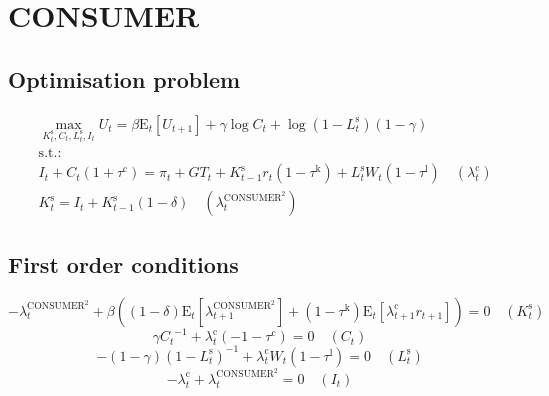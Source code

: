 

\section{CONSUMER}

\subsection{Optimisation problem}

\begin{align}
&\max_{K^{\mathrm{s}}_{t}, C_{t}, L^{\mathrm{s}}_{t}, I_{t}
} U_{t} = {\beta} {\mathrm{E}_{t}\left[U_{t+1}\right]} + {\gamma} {\log{C_{t}}} + {\log\left(1 - L^{\mathrm{s}}_{t}\right)} \left(1 - \gamma\right)\\
&\mathrm{s.t.:}\nonumber\\
& I_{t} + {C_{t}} \left(1 + \tau^{\mathrm{c}}\right) = \pi_{t} + {G\!T}_{t} + {K^{\mathrm{s}}_{t-1}} {r_{t}} \left(1 - \tau^{\mathrm{k}}\right) + {L^{\mathrm{s}}_{t}} {W_{t}} \left(1 - \tau^{\mathrm{l}}\right) \quad \left(\lambda^{\mathrm{c}}_{t}\right)\\
& K^{\mathrm{s}}_{t} = I_{t} + {K^{\mathrm{s}}_{t-1}} \left(1 - \delta\right) \quad \left(\lambda^{\mathrm{CONSUMER}^{\mathrm{2}}}_{t}\right)
\end{align}


\subsection{First order conditions}

\begin{equation}
-\lambda^{\mathrm{CONSUMER}^{\mathrm{2}}}_{t} + {\beta} \left(\left(1 - \delta\right) {\mathrm{E}_{t}\left[\lambda^{\mathrm{CONSUMER}^{\mathrm{2}}}_{t+1}\right]} + \left(1 - \tau^{\mathrm{k}}\right) {\mathrm{E}_{t}\left[{\lambda^{\mathrm{c}}_{t+1}} {r_{t+1}}\right]}\right) = 0
 \quad \left(K^{\mathrm{s}}_{t}\right)
\end{equation}
\begin{equation}
{\gamma} {C_{t}}^{-1} + {\lambda^{\mathrm{c}}_{t}} \left(-1 - \tau^{\mathrm{c}}\right) = 0
 \quad \left(C_{t}\right)
\end{equation}
\begin{equation}
-\left(1 - \gamma\right) \left(1 - L^{\mathrm{s}}_{t}\right)^{-1} + {\lambda^{\mathrm{c}}_{t}} {W_{t}} \left(1 - \tau^{\mathrm{l}}\right) = 0
 \quad \left(L^{\mathrm{s}}_{t}\right)
\end{equation}
\begin{equation}
-\lambda^{\mathrm{c}}_{t} + \lambda^{\mathrm{CONSUMER}^{\mathrm{2}}}_{t} = 0
 \quad \left(I_{t}\right)
\end{equation}




